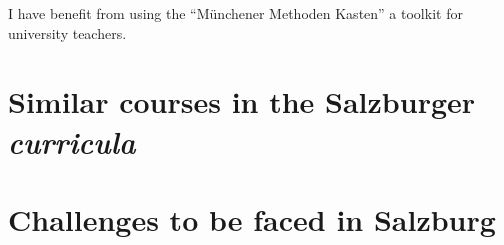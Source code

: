 \documentclass[a4paper,11pt]{article}
\begin{document}
I have benefit from using the ``M\"unchener Methoden Kasten'' a toolkit for university teachers.

\section*{Similar courses in the Salzburger \emph{curricula}}


\section*{Challenges to be faced in Salzburg}







\newpage

\begingroup
\parindent 0pt
\def\enotesize{\footnotesize}
\theendnotes
\endgroup

\end{document}
